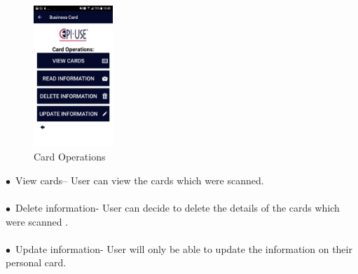 \documentclass[english]{article}
\begin{document}
\begin{figure}[ht!]
\centering
\includegraphics[width=30mm]{operations.png}
\caption{Card Operations }
\end{figure}


$\bullet$\ View cards– User can view the cards which were scanned. \\
\\$\bullet$\ Delete information- User can decide to delete the details of the cards which were scanned . \\
\\$\bullet$\ Update information- User will only be able to update the information on their personal card.


				\newpage
\end{document}
